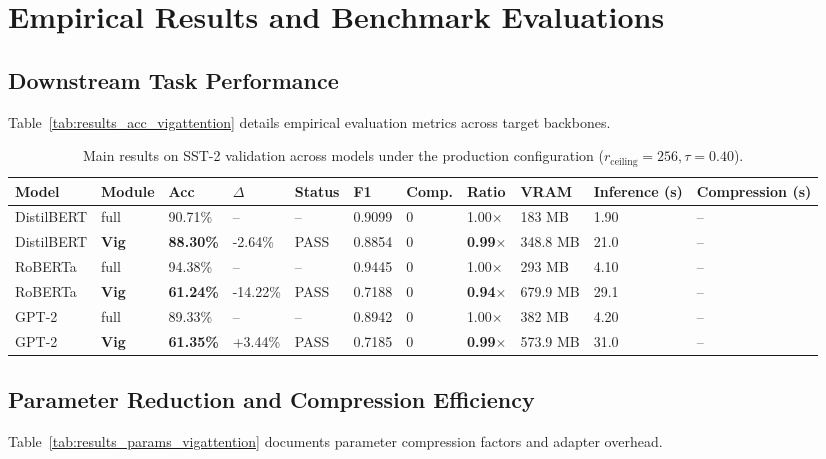 \section{Empirical Results and Benchmark Evaluations}

\subsection{Downstream Task Performance}
Table~\ref{tab:results_acc_vigattention} details empirical evaluation metrics across target backbones.

\begin{table}[t]
\centering
\small
\begin{tabular}{lllllllllll}
\toprule
\textbf{Model} & \textbf{Module} & \textbf{Acc} & \textbf{$\Delta$} & \textbf{Status} & \textbf{F1} & \textbf{Comp.} & \textbf{Ratio} & \textbf{VRAM} & \textbf{Inference (s)} & \textbf{Compression (s)} \\
\midrule
DistilBERT & full & 90.71\% & -- & -- & 0.9099 & 0 & 1.00$\times$ & 183 MB & 1.90 & -- \\
DistilBERT & \textbf{Vig} & \textbf{88.30\%} & -2.64\% & PASS & 0.8854 & 0 & \textbf{0.99$\times$} & 348.8 MB & 21.0 & -- \\
RoBERTa & full & 94.38\% & -- & -- & 0.9445 & 0 & 1.00$\times$ & 293 MB & 4.10 & -- \\
RoBERTa & \textbf{Vig} & \textbf{61.24\%} & -14.22\% & PASS & 0.7188 & 0 & \textbf{0.94$\times$} & 679.9 MB & 29.1 & -- \\
GPT-2 & full & 89.33\% & -- & -- & 0.8942 & 0 & 1.00$\times$ & 382 MB & 4.20 & -- \\
GPT-2 & \textbf{Vig} & \textbf{61.35\%} & +3.44\% & PASS & 0.7185 & 0 & \textbf{0.99$\times$} & 573.9 MB & 31.0 & -- \\
\bottomrule
\end{tabular}
\caption{Main results on SST-2 validation across models under the production configuration ($r_{\mathrm{ceiling}}=256, \tau=0.40$).}
\label{tab:main_sst2}
\end{table}

\subsection{Parameter Reduction and Compression Efficiency}
Table~\ref{tab:results_params_vigattention} documents parameter compression factors and adapter overhead.

